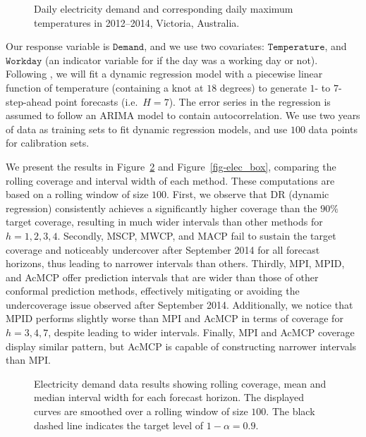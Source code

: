 \documentclass[
  11pt,
  a4paper,
]{article}
\theoremstyle{plain}
\theoremstyle{remark}
\begin{document}
\begin{figure}


\caption{\label{fig-elec_data}Daily electricity demand and corresponding
daily maximum temperatures in 2012--2014, Victoria, Australia.}

\end{figure}%

Our response variable is \(\texttt{Demand}\), and we use two covariates:
\(\texttt{Temperature}\), and \(\texttt{Workday}\) (an indicator
variable for if the day was a working day or not). Following
\textcite{hyndman2021}, we will fit a dynamic regression model with a
piecewise linear function of temperature (containing a knot at \(18\)
degrees) to generate \(1\)- to \(7\)-step-ahead point forecasts
(i.e.~\(H=7\)). The error series in the regression is assumed to follow
an ARIMA model to contain autocorrelation. We use two years of data as
training sets to fit dynamic regression models, and use \(100\) data
points for calibration sets.

We present the results in Figure~\ref{fig-elec_cov} and
Figure~\ref{fig-elec_box}, comparing the rolling coverage and interval
width of each method. These computations are based on a rolling window
of size \(100\). First, we observe that DR (dynamic regression)
consistently achieves a significantly higher coverage than the \(90\%\)
target coverage, resulting in much wider intervals than other methods
for \(h=1,2,3,4\). Secondly, MSCP, MWCP, and MACP fail to sustain the
target coverage and noticeably undercover after September 2014 for all
forecast horizons, thus leading to narrower intervals than others.
Thirdly, MPI, MPID, and AcMCP offer prediction intervals that are wider
than those of other conformal prediction methods, effectively mitigating
or avoiding the undercoverage issue observed after September 2014.
Additionally, we notice that MPID performs slightly worse than MPI and
AcMCP in terms of coverage for \(h=3,4,7\), despite leading to wider
intervals. Finally, MPI and AcMCP coverage display similar pattern, but
AcMCP is capable of constructing narrower intervals than MPI.

\begin{figure}


\caption{\label{fig-elec_cov}Electricity demand data results showing
rolling coverage, mean and median interval width for each forecast
horizon. The displayed curves are smoothed over a rolling window of size
\(100\). The black dashed line indicates the target level of
\(1-\alpha=0.9\).}

\end{figure}%
\end{document}

